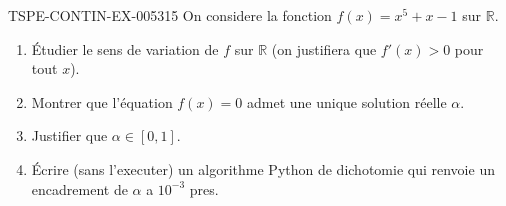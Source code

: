 \begin{exercice}{TSPE-CONTIN-EX-005}{3}{15}
On considere la fonction $f(x) = x^5 + x - 1$ sur $\mathbb{R}$.
\begin{enumerate}
  \item Étudier le sens de variation de $f$ sur $\mathbb{R}$ (on justifiera que $f'(x) > 0$ pour tout $x$).
  \item Montrer que l'équation $f(x) = 0$ admet une unique solution réelle $\alpha$.
  \item Justifier que $\alpha \in [0, 1]$.
  \item Écrire (sans l'executer) un algorithme Python de dichotomie qui renvoie un encadrement de $\alpha$ a $10^{-3}$ pres.
\end{enumerate}
\end{exercice}
